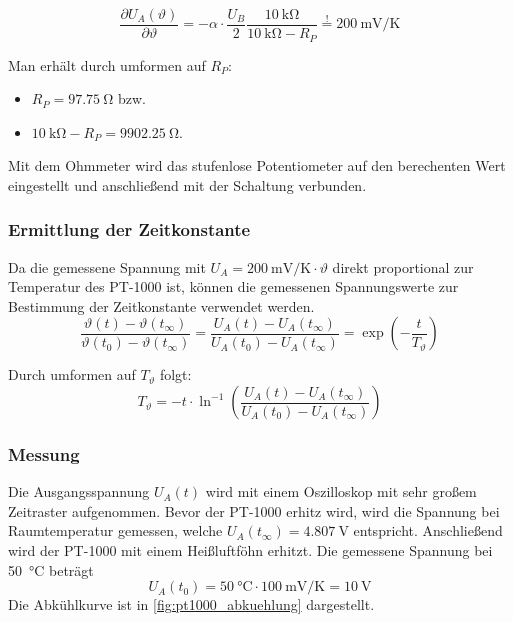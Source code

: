 \begin{equation*}
	\frac{\partial U_A(\vartheta)}{\partial \vartheta} = -\alpha \cdot \frac{U_B}{2} \frac{\SI{10}{\kilo\ohm}}{\SI{10}{\kilo\ohm} - R_P} \stackrel{!}{=} \SI{200}{\milli\volt\per\kelvin}
\end{equation*}

Man erhält durch umformen auf $R_P$:
\begin{itemize}[noitemsep]
	\item $R_P = \SI{97.75}{\ohm}$ bzw.
	\item $\SI{10}{\kilo\ohm} - R_P = \SI{9902.25}{\ohm}$.
\end{itemize}

Mit dem Ohmmeter wird das stufenlose Potentiometer auf den berechenten Wert
eingestellt und anschließend mit der Schaltung verbunden.

\subsubsection{Ermittlung der Zeitkonstante}

Da die gemessene Spannung mit $U_A = \SI{200}{\milli\volt\per\kelvin}\cdot\vartheta$ direkt proportional zur Temperatur des PT-1000 ist,
können die gemessenen Spannungswerte zur Bestimmung der Zeitkonstante
verwendet werden. 
\begin{equation*}
	\frac{\vartheta(t) - \vartheta(t_\infty)}{\vartheta(t_0) - \vartheta(t_\infty)}
	= \frac{U_A(t) - U_A(t_\infty)}{U_A(t_0) - U_A(t_\infty)}
	= \exp\left(-\frac{t}{T_\vartheta}\right)
\end{equation*}

Durch umformen auf $T_\vartheta$ folgt:
\begin{equation}
	T_\vartheta = -t\cdot \ln^{-1}\left(\frac{U_A(t) - U_A(t_\infty)}{U_A(t_0) - U_A(t_\infty)}\right)\label{eq:pt1000_timeconstant}
\end{equation}

\subsubsection{Messung}

Die Ausgangsspannung $U_A(t)$ wird mit einem Oszilloskop mit sehr großem
Zeitraster aufgenommen. Bevor der PT-1000 erhitz wird, wird die Spannung bei
Raumtemperatur gemessen, welche $U_A(t_\infty)=\SI{4.807}{\volt}$ entspricht.
Anschließend wird der PT-1000 mit einem Heißluftföhn erhitzt. Die gemessene
Spannung bei \SI{50}{\degreeCelsius} beträgt
\[
U_A(t_0)=\SI{50}{\degreeCelsius}\cdot \SI{100}{\milli\volt\per\kelvin} = \SI{10}{\volt}
\]
Die Abkühlkurve ist in \autoref{fig:pt1000_abkuehlung}
dargestellt.

